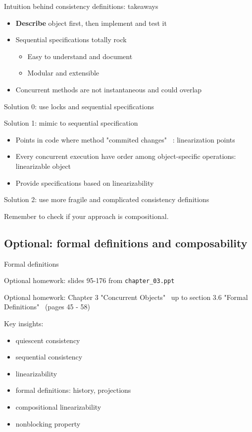 \begin{frame}[fragile]{Intuition behind consistency definitions: takeaways}

\begin{itemize}
  \item \textbf{Describe} object first, then implement and test it
  \item Sequential specifications totally rock
  \begin{itemize}
    \item Easy to understand and document
    \item Modular and extensible
  \end{itemize}

  \item Concurrent methods are not instantaneous and could overlap
\end{itemize}

\pause

Solution 0: use locks and sequential specifications

\pause

Solution 1: mimic to sequential specification
\begin{itemize}
  \item Points in code where method "commited changes" \ : linearization points
  \item Every concurrent execution have order among object-specific operations: linearizable object
  \item Provide specifications based on linearizability
\end{itemize}

\pause

Solution 2: use more fragile and complicated consistency definitions

\pause

Remember to check if your approach is compositional.

\end{frame}

\subsection{Optional: formal definitions and composability}
\showTOCSub

\begin{frame}{Formal definitions}

Optional homework: slides 95-176 from \texttt{chapter\_03.ppt}

Optional homework: Chapter 3 "Concurrent Objects" \ up to section 3.6 "Formal Definitions" \ (pages 45 - 58)

Key insights: 
\begin{itemize}
  \item quiescent consistency
  \item sequential consistency
  \item linearizability
  \item formal definitions: history, projections
  \item compositional linearizability
  \item nonblocking property
\end{itemize}

\end{frame}

